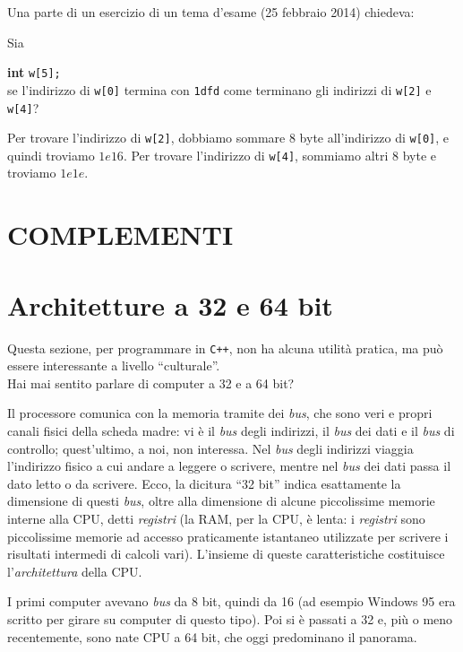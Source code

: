 	Una parte di un esercizio di un tema d'esame (25 febbraio 2014) chiedeva:
\begin{shaded}
Sia
 
\qquad\textbf{int} \verb|w[5];|\\
se l'indirizzo di \verb|w[0]| termina con \verb|1dfd| come terminano gli indirizzi 
di \verb|w[2]| e \verb|w[4]|?
\end{shaded}
Per trovare l'indirizzo di \verb|w[2]|, dobbiamo sommare 8 byte all'indirizzo di \verb|w[0]|, e quindi troviamo $1e16$. Per trovare l'indirizzo di \verb|w[4]|, sommiamo altri 8 byte e troviamo $1e1e$.
\begin{subappendices}
	\section*{COMPLEMENTI}
\section{Architetture a 32 e 64 bit}\label{archCPU}
Questa sezione, per programmare in \verb|C++|, non ha alcuna utilità  pratica, ma può essere interessante a livello ``culturale''.\\

Hai mai sentito parlare di computer a 32 e a 64 bit? 

Il processore comunica con la memoria tramite dei \emph{bus}, che sono veri e propri canali fisici della scheda madre: vi è il \emph{bus} degli indirizzi, il \emph{bus} dei dati e il \emph{bus} di controllo; quest'ultimo, a noi, non interessa. Nel \emph{bus} degli indirizzi viaggia l'indirizzo fisico a cui andare a leggere o scrivere, mentre nel \emph{bus} dei dati passa il dato letto o da scrivere. Ecco, la dicitura ``32 bit'' indica esattamente la dimensione di questi \emph{bus}, oltre alla dimensione di alcune piccolissime memorie interne alla CPU, detti \emph{registri} (la RAM, per la CPU, è lenta: i \emph{registri} sono piccolissime memorie ad accesso praticamente istantaneo utilizzate per scrivere i risultati intermedi di calcoli vari). L'insieme di queste caratteristiche costituisce l'\emph{architettura} della CPU. 

I primi computer avevano \emph{bus} da 8 bit, quindi da 16 (ad esempio Windows 95 era scritto per girare su computer di questo tipo). Poi si è passati a 32 e, più o meno recentemente, sono nate CPU a 64 bit, che oggi predominano il panorama.


\end{subappendices}
